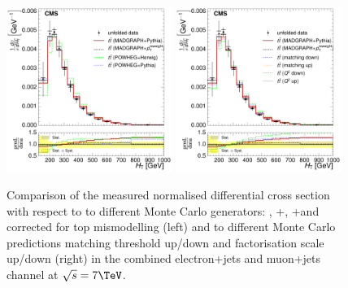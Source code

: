 \begin{figure}[hbtp]
    \centering
     \includegraphics[width=0.48\textwidth]{Chapters/04_Analysis/04b_XSections/images/results/7TeV/HT/central/normalised_xsection_combined_different_generators.pdf}\hfill
     \includegraphics[width=0.48\textwidth]{Chapters/04_Analysis/04b_XSections/images/results/7TeV/HT/central/normalised_xsection_combined_systematics_shifts.pdf}\hfill
     \caption{Comparison of the measured normalised differential cross section with respect to \HT to
     different Monte Carlo generators: \MADGRAPH, \POWHEG+\HERWIG, \POWHEG+\PYTHIA and \MADGRAPH corrected for
     top \pt mismodelling (left) and to different Monte Carlo predictions matching threshold up/down and
     factorisation scale up/down (right) in the combined electron+jets and muon+jets channel at
     $\sqrt{s}=7\TeV$.}
     \label{fig:result_HT_7TeV_combined}
\end{figure}

